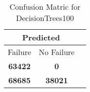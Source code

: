 \begin{table}[] 
\caption{Confusion Matric for DecisionTrees100} 
\label{Table: Prediction Accuracy-NoneDecisionTrees100DecisionTrees100EKF-ignoresolarPanelDipole-solarPanelDipole} 
\centering 
\begin{tabular} 
 {@{}ccc@{}} 
\toprule 
\multicolumn{2}{c}{\textbf{Predicted}}
 \\ \midrule 
\multicolumn{1}{|c|}{Failure} & 
\multicolumn{1}{c|}{No Failure}
 \\ \midrule 
\multicolumn{1}{|c|}{\color{red}\textbf{63422}} & 
\multicolumn{1}{c|}{\color{red}\textbf{0}}
 \\ \midrule 
\multicolumn{1}{|c|}{\color{green}\textbf{68685}} & 
\multicolumn{1}{c|}{\color{green}\textbf{38021}}
 \\ \bottomrule 
\end{tabular} 
\end{table} 

